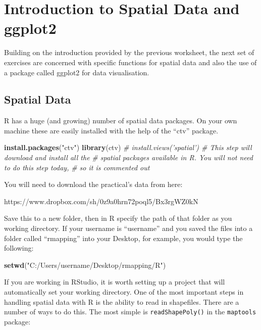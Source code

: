 \documentclass[]{article}
\newenvironment{Shaded}{}{}
\newcommand{\KeywordTok}[1]{\textcolor[rgb]{0.00,0.44,0.13}{\textbf{{#1}}}}
\newcommand{\StringTok}[1]{\textcolor[rgb]{0.25,0.44,0.63}{{#1}}}
\newcommand{\CommentTok}[1]{\textcolor[rgb]{0.38,0.63,0.69}{\textit{{#1}}}}
\newcommand{\NormalTok}[1]{{#1}}
\begin{document}
\section{Introduction to Spatial Data and ggplot2}

Building on the introduction provided by the previous worksheet, the
next set of exercises are concerned with specific functions for spatial
data and also the use of a package called ggplot2 for data
visualisation.

\subsection{Spatial Data}

R has a huge (and growing) number of spatial data packages. On your own
machine these are easily installed with the help of the ``ctv'' package.

\begin{Shaded}
\begin{Highlighting}[]
\KeywordTok{install.packages}\NormalTok{(}\StringTok{"ctv"}\NormalTok{)}
\KeywordTok{library}\NormalTok{(ctv)}
\CommentTok{# install.views('spatial') # This step will download and install all the}
\CommentTok{# spatial packages available in R.  You will not need to do this step today,}
\CommentTok{# so it is commented out}
\end{Highlighting}
\end{Shaded}
You will need to download the practical's data from here:

https://www.dropbox.com/sh/0z9a0hrn72poql5/Bx3rgWZ0kN

Save this to a new folder, then in R specify the path of that folder as
you working directory. If your username is ``username'' and you saved
the files into a folder called ``rmapping'' into your Desktop, for
example, you would type the following:

\begin{Shaded}
\begin{Highlighting}[]
\KeywordTok{setwd}\NormalTok{(}\StringTok{"C:/Users/username/Desktop/rmapping/R"}\NormalTok{)}
\end{Highlighting}
\end{Shaded}
If you are working in RStudio, it is worth setting up a project that
will automatically set your working directory. One of the most important
steps in handling spatial data with R is the ability to read in
shapefiles. There are a number of ways to do this. The most simple is
\texttt{readShapePoly()} in the \texttt{maptools} package:
\end{document}
